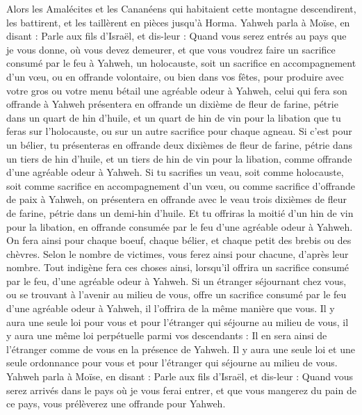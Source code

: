 \begin{multicols}{2}
Alors les Amalécites et les Cananéens qui habitaient cette montagne descendirent, les battirent, et les taillèrent en pièces jusqu'à Horma.
\VerseOne{}Yahweh parla à Moïse, en disant :
Parle aux fils d'Israël, et dis-leur : Quand vous serez entrés au pays que je vous donne, où vous devez demeurer,
et que vous voudrez faire un sacrifice consumé par le feu à Yahweh, un holocauste, soit un sacrifice en accompagnement d’un vœu, ou en offrande volontaire, ou bien dans vos fêtes, pour produire avec votre gros ou votre menu bétail une agréable odeur à Yahweh,
celui qui fera son offrande à Yahweh présentera en offrande un dixième de fleur de farine, pétrie dans un quart de hin d'huile,
et un quart de hin de vin pour la libation que tu feras sur l'holocauste, ou sur un autre sacrifice pour chaque agneau.
Si c'est pour un bélier, tu présenteras en offrande deux dixièmes de fleur de farine, pétrie dans un tiers de hin d'huile,
et un tiers de hin de vin pour la libation, comme offrande d’une agréable odeur à Yahweh.
Si tu sacrifies un veau, soit comme holocauste, soit comme sacrifice en accompagnement d’un vœu, ou comme sacrifice d’offrande de paix à Yahweh,
on présentera en offrande avec le veau trois dixièmes de fleur de farine, pétrie dans un demi-hin d'huile.
Et tu offriras la moitié d'un hin de vin pour la libation, en offrande consumée par le feu d’une agréable odeur à Yahweh.
On fera ainsi pour chaque boeuf, chaque bélier, et chaque petit des brebis ou des chèvres.
Selon le nombre de victimes, vous ferez ainsi pour chacune, d’après leur nombre.
Tout indigène fera ces choses ainsi, lorsqu’il offrira un sacrifice consumé par le feu, d’une agréable odeur à Yahweh.
Si un étranger séjournant chez vous, ou se trouvant à l’avenir au milieu de vous, offre un sacrifice consumé par le feu d’une agréable odeur à Yahweh, il l’offrira de la même manière que vous.
Il y aura une seule loi pour vous et pour l'étranger qui séjourne au milieu de vous, il y aura une même loi perpétuelle parmi vos descendants : Il en sera ainsi de l'étranger comme de vous en la présence de Yahweh.
Il y aura une seule loi et une seule ordonnance pour vous et pour l'étranger qui séjourne au milieu de vous.
Yahweh parla à Moïse, en disant :
Parle aux fils d'Israël, et dis-leur : Quand vous serez arrivés dans le pays où je vous ferai entrer,
et que vous mangerez du pain de ce pays, vous prélèverez une offrande pour Yahweh.

\end{multicols}

